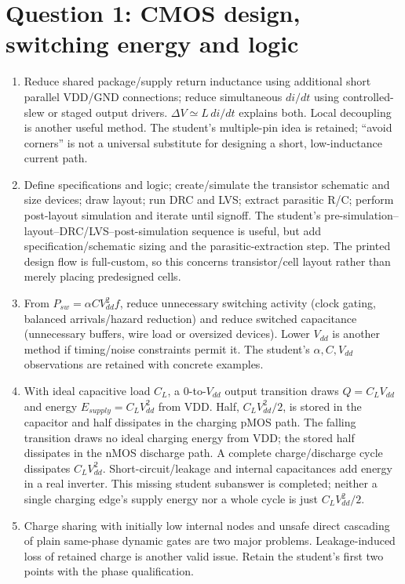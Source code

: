 \documentclass[10pt]{article}
\begin{document}
\section*{Question 1: CMOS design, switching energy and logic}
\begin{enumerate}[label=(\alph*)]
\item Reduce shared package/supply return inductance using additional short parallel VDD/GND connections; reduce simultaneous $di/dt$ using controlled-slew or staged output drivers. $\Delta V\simeq L\,di/dt$ explains both. Local decoupling is another useful method. The student's multiple-pin idea is retained; ``avoid corners'' is not a universal substitute for designing a short, low-inductance current path.
\item Define specifications and logic; create/simulate the transistor schematic and size devices; draw layout; run DRC and LVS; extract parasitic R/C; perform post-layout simulation and iterate until signoff. The student's pre-simulation--layout--DRC/LVS--post-simulation sequence is useful, but add specification/schematic sizing and the parasitic-extraction step. The printed design flow is full-custom, so this concerns transistor/cell layout rather than merely placing predesigned cells.
\item From $P_{sw}=\alpha C V_{dd}^2f$, reduce unnecessary switching activity (clock gating, balanced arrivals/hazard reduction) and reduce switched capacitance (unnecessary buffers, wire load or oversized devices). Lower $V_{dd}$ is another method if timing/noise constraints permit it. The student's $\alpha,C,V_{dd}$ observations are retained with concrete examples.
\item With ideal capacitive load $C_L$, a 0-to-$V_{dd}$ output transition draws $Q=C_LV_{dd}$ and energy $E_{supply}=C_LV_{dd}^2$ from VDD. Half, $C_LV_{dd}^2/2$, is stored in the capacitor and half dissipates in the charging pMOS path. The falling transition draws no ideal charging energy from VDD; the stored half dissipates in the nMOS discharge path. A complete charge/discharge cycle dissipates $C_LV_{dd}^2$. Short-circuit/leakage and internal capacitances add energy in a real inverter. This missing student subanswer is completed; neither a single charging edge's supply energy nor a whole cycle is just $C_LV_{dd}^2/2$.
\item Charge sharing with initially low internal nodes and unsafe direct cascading of plain same-phase dynamic gates are two major problems. Leakage-induced loss of retained charge is another valid issue. Retain the student's first two points with the phase qualification.

\end{enumerate}
\end{document}
